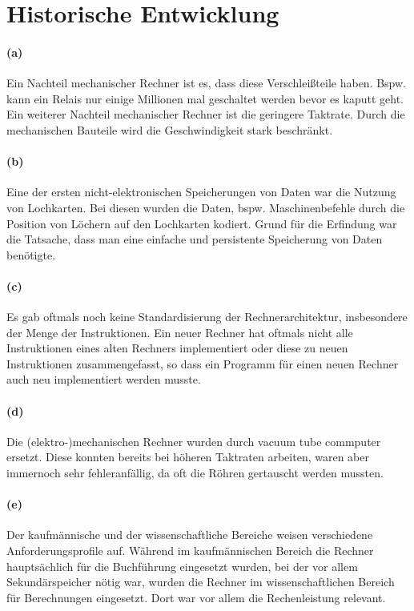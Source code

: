 \documentclass[a4paper]{article}
\begin{document}
\section{Historische Entwicklung}
\paragraph{(a)}
Ein Nachteil mechanischer Rechner ist es, dass diese Verschleißteile haben. Bspw. kann ein Relais nur einige Millionen mal geschaltet werden bevor es kaputt geht.\\
Ein weiterer Nachteil mechanischer Rechner ist die geringere Taktrate. Durch die mechanischen Bauteile wird die Geschwindigkeit stark beschränkt.

\paragraph{(b)}
Eine der ersten nicht-elektronischen Speicherungen von Daten war die Nutzung von Lochkarten. Bei diesen wurden die Daten, bspw. Maschinenbefehle durch die Position von Löchern auf den Lochkarten kodiert. Grund für die Erfindung war die Tatsache, dass man eine einfache und persistente Speicherung von Daten benötigte.
\paragraph{(c)}
Es gab oftmals noch keine Standardisierung der Rechnerarchitektur, insbesondere der Menge der Instruktionen. Ein neuer Rechner hat oftmals nicht alle Instruktionen eines alten Rechners implementiert oder diese zu neuen Instruktionen zusammengefasst, so dass ein Programm für einen neuen Rechner auch neu implementiert werden musste.


\paragraph{(d)}
Die (elektro-)mechanischen Rechner wurden durch vacuum tube commputer ersetzt.
Diese konnten bereits bei höheren Taktraten arbeiten, waren aber immernoch sehr fehleranfällig, da oft die Röhren gertauscht werden mussten.

\paragraph{(e)}
Der kaufmännische und der wissenschaftliche Bereiche weisen verschiedene Anforderungsprofile auf. Während im kaufmännischen Bereich die Rechner hauptsächlich für die Buchführung eingesetzt wurden, bei der vor allem Sekundärspeicher nötig war, wurden die Rechner im wissenschaftlichen Bereich für Berechnungen eingesetzt. Dort war vor allem die Rechenleistung relevant.
\end{document}
